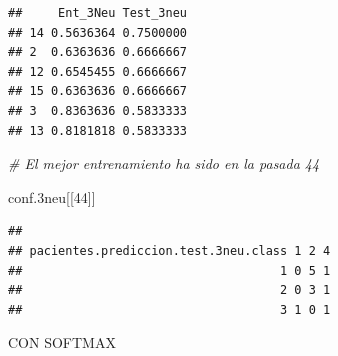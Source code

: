 \documentclass[]{article}
\newenvironment{Shaded}{\begin{snugshade}}{\end{snugshade}}
\newcommand{\CommentTok}[1]{\textcolor[rgb]{0.56,0.35,0.01}{\textit{#1}}}
\newcommand{\DecValTok}[1]{\textcolor[rgb]{0.00,0.00,0.81}{#1}}
\newcommand{\FloatTok}[1]{\textcolor[rgb]{0.00,0.00,0.81}{#1}}
\newcommand{\NormalTok}[1]{#1}
\begin{document}
\begin{verbatim}
##     Ent_3Neu Test_3neu
## 14 0.5636364 0.7500000
## 2  0.6363636 0.6666667
## 12 0.6545455 0.6666667
## 15 0.6363636 0.6666667
## 3  0.8363636 0.5833333
## 13 0.8181818 0.5833333
\end{verbatim}

\begin{Shaded}
\begin{Highlighting}[]
\CommentTok{# El mejor entrenamiento ha sido en la pasada 44}

\NormalTok{conf}\FloatTok{.3}\NormalTok{neu[[}\DecValTok{44}\NormalTok{]]}
\end{Highlighting}
\end{Shaded}

\begin{verbatim}
##                                     
## pacientes.prediccion.test.3neu.class 1 2 4
##                                    1 0 5 1
##                                    2 0 3 1
##                                    3 1 0 1
\end{verbatim}

CON SOFTMAX
\end{document}

